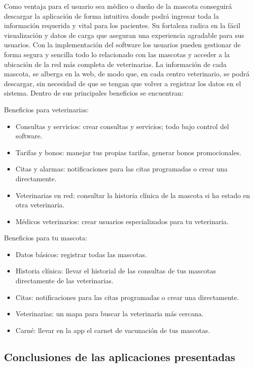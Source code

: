 Como ventaja para el usuario sea médico o dueño de la mascota conseguirá descargar la aplicación de forma intuitiva donde podrá ingresar toda la información requerida y vital para los pacientes. Su fortaleza radica en la fácil visualización y datos de carga que aseguran una experiencia agradable para sus usuarios. Con la implementación del software los usuarios pueden gestionar de forma segura y sencilla todo lo relacionado con las mascotas y acceder a la ubicación de la red más completa de veterinarias. La información de cada mascota, se alberga en la web, de modo que, en cada centro veterinario, se podrá descargar, sin necesidad de que se tengan que volver a registrar los datos en el sistema. Dentro de sus principales beneficios se encuentran:

Beneficios para veterinarias:
\begin{itemize}


\item	Consultas y servicios: crear consultas y servicios; todo bajo control del software.
\item	Tarifas y bonos: manejar tus propias tarifas, generar bonos promocionales.
\item	Citas y alarmas: notificaciones para las citas programadas o crear una directamente.
\item	Veterinarias en red: consultar la historia clínica de la mascota si ha estado en otra veterinaria.
\item	Médicos veterinarios: crear usuarios especializados para tu veterinaria.

\end{itemize}

Beneficios para tu mascota:
\begin{itemize}


\item	Datos básicos: registrar todas las mascotas.
\item	Historia clínica: llevar el historial de las consultas de tus mascotas directamente de las veterinarias.
\item	Citas: notificaciones para las citas programadas o crear una directamente.
\item	Veterinarias: un mapa para buscar la veterinaria más cercana.
\item	Carné: llevar en la app el carnet de vacunación de tus mascotas.
\end{itemize}

\subsection{Conclusiones de las aplicaciones presentadas}\label{chapter:introduction}

